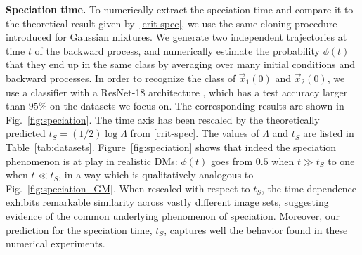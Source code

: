 \documentclass[10pt,twocolumn]{article}
\begin{document}
{\bf Speciation time.} To numerically extract the speciation time and compare it to the theoretical result given by~\eqref{crit-spec}, we use the same cloning procedure introduced for Gaussian mixtures. We generate two independent trajectories at time $t$ of the backward process, and numerically estimate the probability $\phi(t)$ that they end up in the same class by averaging over many initial conditions and backward processes. In order to recognize the class of $\vec x_1(0)$ and $\vec x_2(0)$, we use a classifier with a ResNet-18 architecture \cite{Kaiming2015_ResNet}, which has a test accuracy larger than $95\%$ on the datasets we focus on.
The corresponding results are shown in Fig.~\ref{fig:speciation}. The time axis has been rescaled by the theoretically predicted $t_S=(1/2)\log \Lambda$ from \eqref{crit-spec}. The values of $\Lambda$ and $t_S$ are listed in Table~\ref{tab:datasets}. Figure~\ref{fig:speciation} shows that indeed the speciation phenomenon is at play in realistic DMs: $\phi(t)$ goes from $0.5$ when $t \gg t_S$ to one when $t\ll t_S$, in a way which is qualitatively analogous to Fig.~\ref{fig:speciation_GM}. 
When rescaled with respect to $t_S$, the time-dependence exhibits remarkable similarity across vastly different image sets, suggesting evidence of the common underlying phenomenon of speciation.
Moreover, our prediction for the speciation time, $t_S$, captures well the behavior found in these numerical experiments. 
\end{document}
